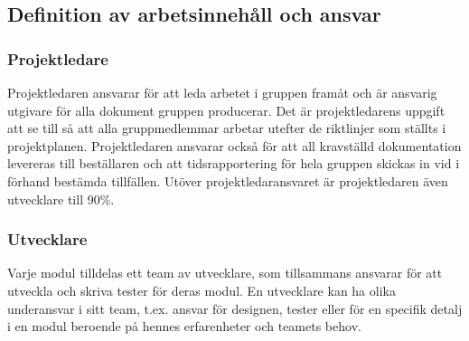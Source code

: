 \documentclass{article}
\begin{document}
\subsection{Definition av arbetsinnehåll och ansvar}
\subsubsection{Projektledare}
Projektledaren ansvarar för att leda arbetet i gruppen framåt och är ansvarig utgivare för alla dokument gruppen producerar. Det är projektledarens uppgift att se till så att alla gruppmedlemmar arbetar utefter de riktlinjer som ställts i projektplanen. Projektledaren ansvarar också för att all kravställd dokumentation levereras till beställaren och att tidsrapportering för hela gruppen skickas in vid i förhand bestämda tillfällen. Utöver projektledaransvaret är projektledaren även utvecklare till 90\%.

\subsubsection{Utvecklare}
Varje modul tilldelas ett team av utvecklare, som tillsammans ansvarar för att utveckla och skriva tester för deras modul. En utvecklare kan ha olika underansvar i sitt team, t.ex. ansvar för designen, tester eller för en specifik detalj i en modul beroende på hennes erfarenheter och teamets behov.
\end{document}
